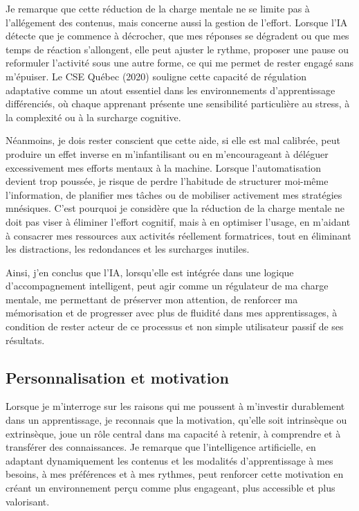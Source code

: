\documentclass[11pt,a4paper]{report}
\begin{document}
Je remarque que cette réduction de la charge mentale ne se limite pas à l’allégement des contenus, mais concerne aussi la gestion de l’effort. Lorsque l’IA détecte que je commence à décrocher, que mes réponses se dégradent ou que mes temps de réaction s’allongent, elle peut ajuster le rythme, proposer une pause ou reformuler l’activité sous une autre forme, ce qui me permet de rester engagé sans m’épuiser. Le CSE Québec (2020) souligne cette capacité de régulation adaptative comme un atout essentiel dans les environnements d’apprentissage différenciés, où chaque apprenant présente une sensibilité particulière au stress, à la complexité ou à la surcharge cognitive.

Néanmoins, je dois rester conscient que cette aide, si elle est mal calibrée, peut produire un effet inverse en m’infantilisant ou en m’encourageant à déléguer excessivement mes efforts mentaux à la machine. Lorsque l’automatisation devient trop poussée, je risque de perdre l’habitude de structurer moi-même l’information, de planifier mes tâches ou de mobiliser activement mes stratégies mnésiques. C’est pourquoi je considère que la réduction de la charge mentale ne doit pas viser à éliminer l’effort cognitif, mais à en optimiser l’usage, en m’aidant à consacrer mes ressources aux activités réellement formatrices, tout en éliminant les distractions, les redondances et les surcharges inutiles.

Ainsi, j’en conclus que l’IA, lorsqu’elle est intégrée dans une logique d’accompagnement intelligent, peut agir comme un régulateur de ma charge mentale, me permettant de préserver mon attention, de renforcer ma mémorisation et de progresser avec plus de fluidité dans mes apprentissages, à condition de rester acteur de ce processus et non simple utilisateur passif de ses résultats.

\subsection{Personnalisation et motivation}

Lorsque je m’interroge sur les raisons qui me poussent à m’investir durablement dans un apprentissage, je reconnais que la motivation, qu’elle soit intrinsèque ou extrinsèque, joue un rôle central dans ma capacité à retenir, à comprendre et à transférer des connaissances. Je remarque que l’intelligence artificielle, en adaptant dynamiquement les contenus et les modalités d’apprentissage à mes besoins, à mes préférences et à mes rythmes, peut renforcer cette motivation en créant un environnement perçu comme plus engageant, plus accessible et plus valorisant.
\end{document}

